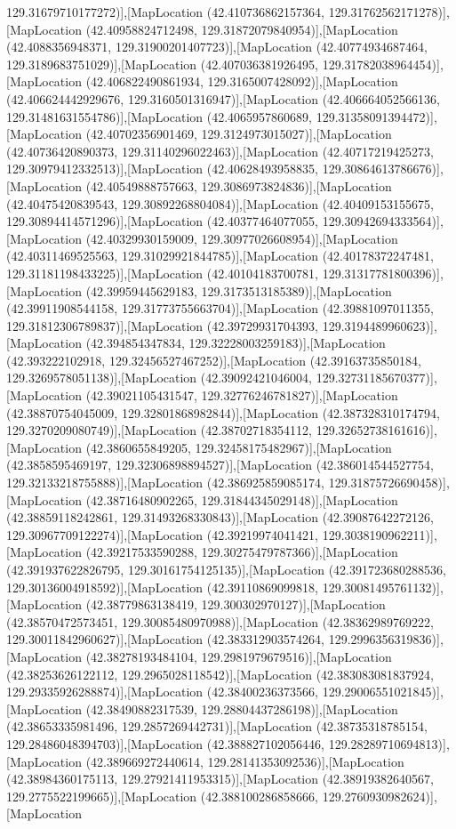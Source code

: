 129.31679710177272)],[MapLocation (42.410736862157364, 129.31762562171278)],[MapLocation (42.40958824712498, 129.31872079840954)],[MapLocation (42.4088356948371, 129.31900201407723)],[MapLocation (42.40774934687464, 129.3189683751029)],[MapLocation (42.407036381926495, 129.31782038964454)],[MapLocation (42.406822490861934, 129.3165007428092)],[MapLocation (42.406624442929676, 129.3160501316947)],[MapLocation (42.406664052566136, 129.31481631554786)],[MapLocation (42.4065957860689, 129.31358091394472)],[MapLocation (42.40702356901469, 129.3124973015027)],[MapLocation (42.40736420890373, 129.31140296022463)],[MapLocation (42.40717219425273, 129.30979412332513)],[MapLocation (42.40628493958835, 129.30864613786676)],[MapLocation (42.40549888757663, 129.3086973824836)],[MapLocation (42.40475420839543, 129.30892268804084)],[MapLocation (42.40409153155675, 129.30894414571296)],[MapLocation (42.40377464077055, 129.30942694333564)],[MapLocation (42.40329930159009, 129.30977026608954)],[MapLocation (42.40311469525563, 129.31029921844785)],[MapLocation (42.40178372247481, 129.31181198433225)],[MapLocation (42.40104183700781, 129.31317781800396)],[MapLocation (42.39959445629183, 129.3173513185389)],[MapLocation (42.39911908544158, 129.31773755663704)],[MapLocation (42.39881097011355, 129.31812306789837)],[MapLocation (42.39729931704393, 129.3194489960623)],[MapLocation (42.394854347834, 129.32228003259183)],[MapLocation (42.393222102918, 129.32456527467252)],[MapLocation (42.39163735850184, 129.3269578051138)],[MapLocation (42.39092421046004, 129.32731185670377)],[MapLocation (42.39021105431547, 129.32776246781827)],[MapLocation (42.38870754045009, 129.32801868982844)],[MapLocation (42.387328310174794, 129.3270209080749)],[MapLocation (42.38702718354112, 129.32652738161616)],[MapLocation (42.3860655849205, 129.32458175482967)],[MapLocation (42.3858595469197, 129.32306898894527)],[MapLocation (42.386014544527754, 129.32133218755888)],[MapLocation (42.386925859085174, 129.31875726690458)],[MapLocation (42.38716480902265, 129.31844345029148)],[MapLocation (42.38859118242861, 129.31493268330843)],[MapLocation (42.39087642272126, 129.30967709122274)],[MapLocation (42.39219974041421, 129.3038190962211)],[MapLocation (42.39217533590288, 129.30275479787366)],[MapLocation (42.391937622826795, 129.30161754125135)],[MapLocation (42.391723680288536, 129.30136004918592)],[MapLocation (42.39110869099818, 129.30081495761132)],[MapLocation (42.38779863138419, 129.300302970127)],[MapLocation (42.38570472573451, 129.30085480970988)],[MapLocation (42.38362989769222, 129.30011842960627)],[MapLocation (42.383312903574264, 129.2996356319836)],[MapLocation (42.38278193484104, 129.2981979679516)],[MapLocation (42.38253626122112, 129.2965028118542)],[MapLocation (42.383083081837924, 129.29335926288874)],[MapLocation (42.38400236373566, 129.29006551021845)],[MapLocation (42.38490882317539, 129.28804437286198)],[MapLocation (42.38653335981496, 129.2857269442731)],[MapLocation (42.38735318785154, 129.28486048394703)],[MapLocation (42.388827102056446, 129.28289710694813)],[MapLocation (42.389669272440614, 129.28141353092536)],[MapLocation (42.38984360175113, 129.27921411953315)],[MapLocation (42.38919382640567, 129.2775522199665)],[MapLocation (42.388100286858666, 129.2760930982624)],[MapLocation 